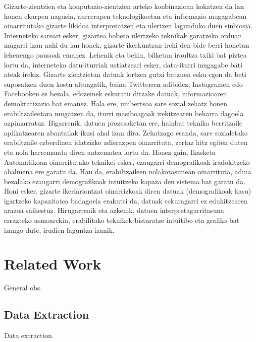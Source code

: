 \documentclass[information,article,submit,moreauthors,pdftex,10pt,a4paper]{Definitions/mdpi}
\begin{document}
\indent Gizarte-zientzien eta konputazio-zientzien arteko konbinazioan kokatzen da lan honen ekarpen nagusia, aurrerapen teknologikoetan eta informazio mugagabean oinarritutako gizarte likidoa \citep{bauman2015modernidad} interpretatzen eta ulertzen lagunduko duen sinbiosia. Interneteko sareari esker, gizartea hobeto ulertzeko teknikak garatzeko orduan mugarri izan nahi du lan honek, gizarte-ikerkuntzan ireki den bide berri honetan lehenengo pausoak emanez. Lehenik eta behin, bilketan iraultza txiki bat piztea lortu da, interneteko datu-iturriak ustiatzeari esker, datu-iturri mugagabe bati ateak irekiz. Gizarte zientzietan datuak lortzea gutxi batzuen esku egon da beti suposatzen duen kostu altuagatik, baina Twitterren adibidez, Instagramen edo Facebooken ez bezala, edozeinek eskuratu ditzake datuak, informazioaren demokratizazio bat emanez. Hala ere, unibertsoa sare sozial zehatz honen erabiltzaileetara mugatzen da, iturri masiboagoak irekitzearen beharra dagoela azpimarratuz. Bigarrenik, datuen prozesaketan ere, hainbat teknika berritzaile aplikatzearen abantailak ikusi ahal izan dira. Zehatzago esanda, sare sozialetako erabiltzaile ezberdinen idatzizko adierazpen oinarrituta, zertaz hitz egiten duten eta nola harremandu diren antzematea lortu da. Honez gain, Ikasketa Automatikoan oinarritutako teknikei esker, ezaugarri demografikoak iradokitzeko ahalmena ere garatu da. Hau da, erabiltzaileen nolakotasunean oinarrituta, adina bezalako ezaugarri demografikoak intuitzeko kapaza den sistema bat garatu da. Honi esker, gizarte ikerlariontzat oinarrizkoak diren datuak (demografikoak kasu) igartzeko kapazitatea badagoela erakutsi da, datuak eskuragarri ez edukitzearen arazoa saihestuz. Hirugarrenik eta azkenik, datuen interpretagarritasuna errazteko asmoarekin, erabilitako teknikek bistaratze intuitibo eta grafiko bat izango dute, irudien laguntza izanik.



\section{Related Work}\label{sec:background}
General obs.

\subsection{Data Extraction}\label{sec:extraction_background}

Data extraction.
\end{document}
